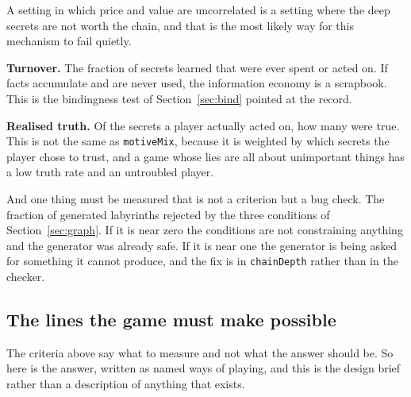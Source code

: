 \documentclass[11pt,a4paper]{article}
\begin{document}
A setting in which price and value are uncorrelated is a setting where the deep secrets are not
worth the chain, and that is the most likely way for this mechanism to fail quietly.

\textbf{Turnover.} The fraction of secrets learned that were ever spent or acted on. If facts
accumulate and are never used, the information economy is a scrapbook. This is the bindingness
test of Section~\ref{sec:bind} pointed at the record.

\textbf{Realised truth.} Of the secrets a player actually acted on, how many were true. This is
not the same as \texttt{motiveMix}, because it is weighted by which secrets the player chose to
trust, and a game whose lies are all about unimportant things has a low truth rate and an
untroubled player.

\begin{alarmbox}
And one thing must be measured that is not a criterion but a bug check. The fraction of generated
labyrinths rejected by the three conditions of Section~\ref{sec:graph}. If it is near zero the
conditions are not constraining anything and the generator was already safe. If it is near one the
generator is being asked for something it cannot produce, and the fix is in
\texttt{chainDepth} rather than in the checker.
\end{alarmbox}

\subsection{The lines the game must make possible}
\label{sec:lines}

The criteria above say what to measure and not what the answer should be. So here is the answer,
written as named ways of playing, and this is the design brief rather than a description of
anything that exists.
\end{document}
